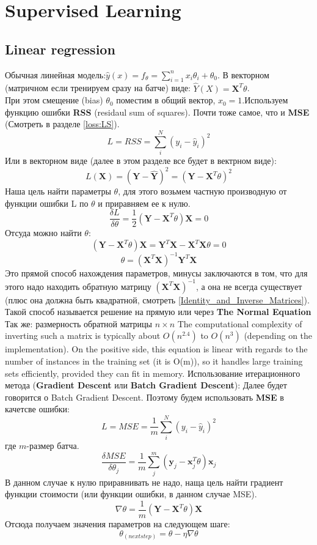 \documentclass{article}
\begin{document}
\section{Supervised Learning}
\subsection{Linear regression}
Обычная линейная модель:$ \hat y(x) = f_\theta = \sum_{i=1}^{n}x_i\theta_i + \theta_0$. В векторном (матричном если тренируем сразу на батче) виде: $\hat Y(X) = \mathbf{X}^T\theta$.\\При этом смещение (bias) $\theta_0$ поместим в общий вектор, $x_0=1$.Используем функцию ошибки \textbf{RSS} (residaul sum of squares). Почти тоже самое, что и \textbf{MSE} (Смотреть в разделе \autoref{loss:LS}).$$L=RSS=\sum_i^N{(y_i-\hat y_i)^2}$$Или в векторном виде (далее в этом разделе все будет в вектрном виде):$$L(\mathbf{X})=(\mathbf{Y}-\hat{\mathbf{Y}})^2=(\mathbf{Y}-\mathbf{X}^T\theta)^2$$Наша цель найти параметры $\theta$, для этого возьмем частную производную от функции ошибки L по $\theta$ и приравняем ее к нулю.$$\frac{\delta L}{\delta \theta}=\frac{1}{2}(\mathbf{Y} - \mathbf{X}^T\theta)\mathbf{X}=0$$Отсуда можно найти $\theta$:$$(\mathbf{Y} - \mathbf{X}^T\theta)\mathbf{X}=\mathbf{Y}^T\mathbf{X}-\mathbf{X}^T\mathbf{X}\theta = 0$$ $$\theta=(\mathbf{X}^T\mathbf{X})^{-1}\mathbf{Y}^T\mathbf{X}$$Это прямой способ нахождения параметров, минусы заключаются в том, что для этого надо находить обратную матрицу $(\mathbf{X}^T\mathbf{X})^{-1}$, а она не всегда существует (плюс она должна быть квадратной, смотреть \autoref{Identity_and_Inverse_Matrices}). Такой способ называется решение на прямую или через \textbf{The Normal Equation} Так же: размерность обратной матрицы $n\times n$ The computational complexity of inverting such a matrix is typically about $O(n^2.4)$ to $O(n^3)$ (depending on the implementation). On the positive side, this equation is linear with regards to the number of instances in the training set (it is
O(m)), so it handles large training sets efficiently, provided they can fit in memory.
Использование итерационного метода (\textbf{Gradient Descent} или \textbf{Batch Gradient Descent}): Далее будет говорится о Batch Gradient Descent. Поэтому будем использовать \textbf{MSE} в качетсве ошибки:$$L=MSE=\frac{1}{m}\sum_i^N{(y_i-\hat y_i)^2}$$где $m$-размер батча.$$\frac{\delta MSE}{\delta \theta_j}=\frac{1}{m}\sum_j^m(\mathbf{y}_j - \mathbf{x}_j^T\theta)\mathbf{x}_j$$В данном случае к нулю приравнивать не надо, наща цель найти градиент функции стоимости (или функции ошибки, в данном случае MSE).$$\nabla \theta = \frac{1}{m}(\mathbf{Y} - \mathbf{X}^T\theta)\mathbf{X}$$Отсюда получаем значения параметров на следующем шаге: $$\theta_{(next step)}=\theta-\eta\nabla\theta$$


\printindex
\end{document}
